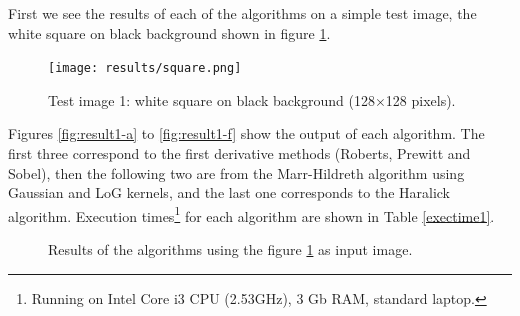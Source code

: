 \documentclass{ipol}
\numberwithin{equation}{section}
\numberwithin{table}{section}
\numberwithin{figure}{section}
\begin{document}
First we see the results of each of the algorithms on a simple test image, the white square on black background shown in figure \ref{fig:original1}. \\

\begin{figure}[h!]
	\centering
	\texttt{[image: results/square.png]}
	\caption{Test image 1: white square on black background (128$\times$128 pixels).}
	\label{fig:original1}
\end{figure}

Figures \ref{fig:result1-a} to \ref{fig:result1-f} show the output of each algorithm. The first three correspond to the first derivative methods (Roberts, Prewitt and Sobel), then the following two are from the Marr-Hildreth algorithm using Gaussian and LoG kernels, and the last one corresponds to the Haralick algorithm. Execution times\footnote{Running on Intel Core i3 CPU (2.53GHz), 3 Gb RAM, standard laptop.} for each algorithm are shown in Table \ref{exectime1}. \\

\begin{figure}[h!]
	\centering
	\quad
	\quad

	\quad
	\quad
	\caption{Results of the algorithms using the figure \ref{fig:original1} as input image.}
	\label{fig:result1}
\end{figure}
\end{document}
